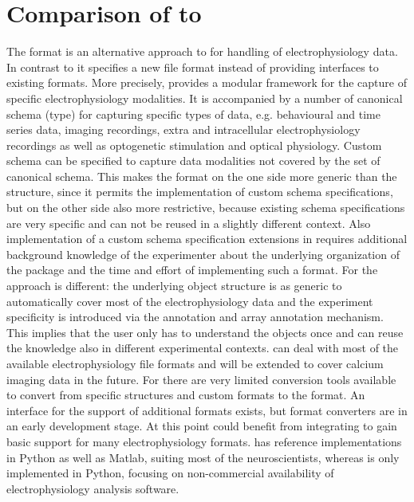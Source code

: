 \section{Comparison of  to }
The  format \citep{Teeters_2015} is an alternative approach to  for handling of electrophysiology data. In contrast to  it specifies a new file format instead of providing interfaces to existing formats. More precisely,  provides a modular framework for the capture of specific electrophysiology modalities. %
It is accompanied by a number of canonical schema (type) for capturing specific types of data, e.g. behavioural and time series data, imaging recordings, extra and intracellular electrophysiology recordings as well as optogenetic stimulation and optical physiology. Custom schema can be specified to capture data modalities not covered by the set of canonical schema.  %
This makes the  format on the one side more generic than the  structure, since it permits the implementation of custom schema specifications, but on the other side also more restrictive, because existing schema specifications are very specific and can not be reused in a slightly different context. Also implementation of a custom schema specification extensions in  requires additional background knowledge of the experimenter about the underlying organization of the  package and the time and effort of implementing such a format. %
For  the approach is different: the underlying object structure is as generic to automatically cover most of the electrophysiology data and the experiment specificity is introduced via the annotation and array annotation mechanism. This implies that the user only has to understand the  objects once and can reuse the knowledge also in different experimental contexts.
 can deal with most of the available electrophysiology file formats and will be extended to cover calcium imaging data in the future. For  there are very limited conversion tools available to convert from specific  structures and custom formats to the  format. %
An interface for the support of additional formats exists, but format converters are in an early development stage. At this point  could benefit from integrating  to gain basic support for many electrophysiology formats.
 has reference implementations in Python as well as Matlab, suiting most of the neuroscientists, whereas  is only implemented in Python, focusing on non-commercial availability of electrophysiology analysis software.


